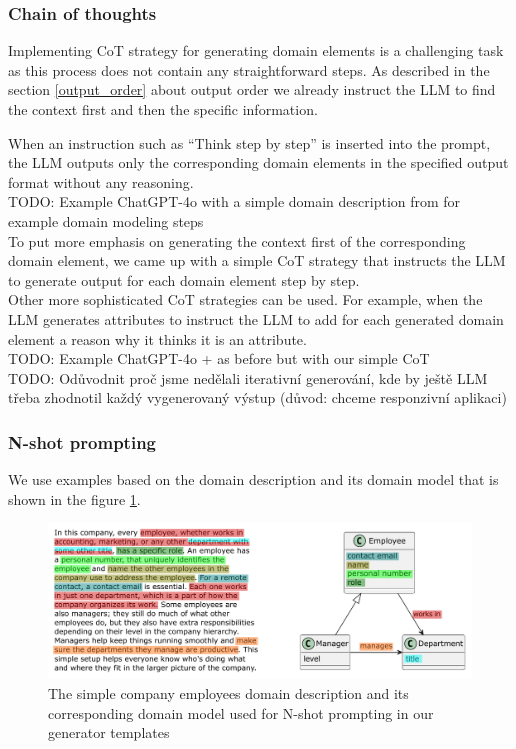 \subsubsection{Chain of thoughts}

Implementing CoT strategy for generating domain elements is a challenging task as this process does not contain any straightforward steps. As described in the section \ref{output_order} about output order we already instruct the LLM to find the context first and then the specific information.

When an instruction such as ``Think step by step'' is inserted into the prompt, the LLM outputs only the corresponding domain elements in the specified output format without any reasoning. \\

TODO: Example ChatGPT-4o with a simple domain description from for example domain modeling steps \\

To put more emphasis on generating the context first of the corresponding domain element, we came up with a simple CoT strategy that instructs the LLM to generate output for each domain element step by step. \\

Other more sophisticated CoT strategies can be used. For example, when the LLM generates attributes to instruct the LLM to add for each generated domain element a reason why it thinks it is an attribute. \\

TODO: Example ChatGPT-4o + as before but with our simple CoT \\


TODO: Odůvodnit proč jsme nedělali iterativní generování, kde by ještě LLM třeba zhodnotil každý vygenerovaný výstup (důvod: chceme responzivní aplikaci)


\subsubsection{N-shot prompting}

We use examples based on the domain description and its domain model that is shown in the figure \ref{fig:prompting-domain}.

\begin{figure}[!h]
    \centering
    \includegraphics[scale=0.6]{img/prompting-domain.pdf}
    \caption{\centering The simple company employees domain description and its corresponding domain model used for N-shot prompting in our generator templates}
    \label{fig:prompting-domain}
\end{figure}


